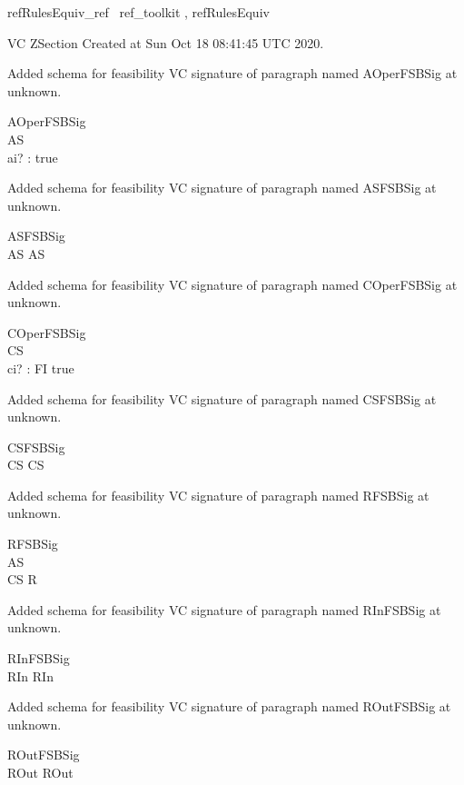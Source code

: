 \documentclass{article}
\begin{document}

\begin{zsection}	 \SECTION refRulesEquiv\_ref \parents~ref\_toolkit , refRulesEquiv
\end{zsection}

VC ZSection Created at Sun Oct 18 08:41:45 UTC 2020.


Added schema for feasibility VC signature of paragraph named AOperFSBSig at unknown.
\begin{schema}{AOperFSBSig}
\\
 AS \\
 ai? : \nat 
\where
 true
\end{schema}


Added schema for feasibility VC signature of paragraph named ASFSBSig at unknown.
\begin{schema}{ASFSBSig}
\\
 AS 
\where
 AS
\end{schema}


Added schema for feasibility VC signature of paragraph named COperFSBSig at unknown.
\begin{schema}{COperFSBSig}
\\
 CS \\
 ci? : FI 
\where
 true
\end{schema}


Added schema for feasibility VC signature of paragraph named CSFSBSig at unknown.
\begin{schema}{CSFSBSig}
\\
 CS 
\where
 CS
\end{schema}


Added schema for feasibility VC signature of paragraph named RFSBSig at unknown.
\begin{schema}{RFSBSig}
\\
 AS \\
 CS 
\where
 R
\end{schema}


Added schema for feasibility VC signature of paragraph named RInFSBSig at unknown.
\begin{schema}{RInFSBSig}
\\
 RIn 
\where
 RIn
\end{schema}


Added schema for feasibility VC signature of paragraph named ROutFSBSig at unknown.
\begin{schema}{ROutFSBSig}
\\
 ROut 
\where
 ROut
\end{schema}
\end{document}
